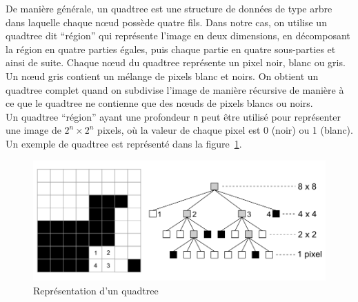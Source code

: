 De manière générale, un quadtree est une structure de données de type arbre dans laquelle chaque nœud possède quatre fils. Dans notre cas, on utilise un quadtree dit \enquote{région} qui représente l'image en deux dimensions, en décomposant la région en quatre parties égales, puis chaque partie en quatre sous-parties et ainsi de suite. Chaque nœud du quadtree représente un pixel noir, blanc ou gris. Un nœud gris contient un mélange de pixels blanc et noirs. On obtient un quadtree complet quand on subdivise l'image de manière récursive de manière à ce que le quadtree ne contienne que des nœuds de pixels blancs ou noirs.\\

Un quadtree \enquote{région} ayant une profondeur \texttt{n} peut être utilisé pour représenter une image de $2^{n}\times2^{n}$ pixels, où la valeur de chaque pixel est 0 (noir) ou 1 (blanc). Un exemple de quadtree est représenté dans la figure~\ref{fig:quadtree}.

\begin{figure}[H]
	\centering
	\includegraphics[scale=0.8]{images/quadTree.png}
	\caption{Représentation d'un quadtree}
	\label{fig:quadtree}
\end{figure}